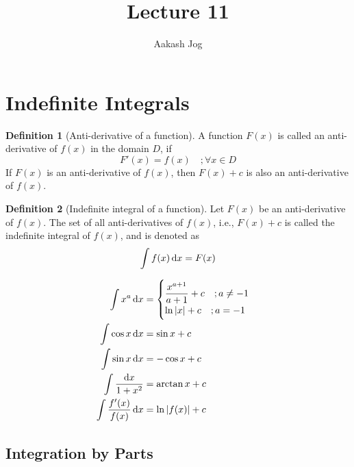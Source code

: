 \documentclass[fleqn]{article}
\title{Lecture 11}
\author{Aakash Jog}
\date{\formatdate{30}{11}{2014}}
\theoremstyle{definition}
\newtheorem{definition}{Definition}
\theoremstyle{theorem}
\theoremstyle{remark}
\begin{document}
	
\maketitle

\tableofcontents

\newpage

\section{Indefinite Integrals}

\begin{definition}[Anti-derivative of a function]
	A function $F(x)$ is called an anti-derivative of $f(x)$ in the domain $D$, if
	\begin{equation*}
	F'(x) = f(x) \quad;\forall x \in D
	\end{equation*}
	If $F(x)$ is an anti-derivative of $f(x)$, then $F(x) + c$ is also an anti-derivative of $f(x)$.
\end{definition}

\begin{definition}[Indefinite integral of a function]
	Let $F(x)$ be an anti-derivative of $f(x)$. The set of all anti-derivatives of $f(x)$, i.e., $F(x) + c$ is called the indefinite integral of $f(x)$, and is denoted as 
	\begin{equation*}
		\int f(x) \dif x = F(x)
	\end{equation*}
\end{definition}

\begin{align}
	\int x^a \dif x &= 
	\begin{cases}
		\dfrac{x^{a + 1}}{a + 1} + c\quad; a \neq -1 \\
		\ln |x| + c \quad; a = -1 \\
	\end{cases}\\
	\int \cos x \dif x &= \sin x + c\\
	\int \sin x \dif x &= -\cos x + c\\
	\int \dfrac{\dif x}{1 + x^2} &= \arctan x + c\\
	\int \dfrac{f'(x)}{f(x)} \dif x &= \ln |f(x)| + c
\end{align}

\subsection{Integration by Parts}
\end{document}
